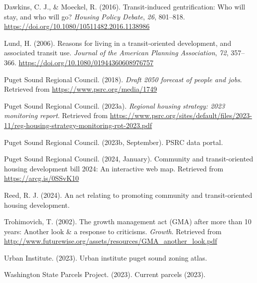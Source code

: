 \documentclass[
]{agujournal2019}
\newlength{\cslhangindent}
\newenvironment{CSLReferences}[2] %
 {\begin{list}{}{%
  \setlength{\itemindent}{0pt}
  \setlength{\leftmargin}{0pt}
  \setlength{\parsep}{0pt}
  \ifodd #1
   \setlength{\leftmargin}{\cslhangindent}
   \setlength{\itemindent}{-1\cslhangindent}
  \fi
  \setlength{\itemsep}{#2\baselineskip}}}
 {\end{list}}
\begin{document}
\label{refs}
\begin{CSLReferences}{1}{0}
\vspace{1em}

Dawkins, C. J., \& Moeckel, R. (2016). Transit-induced gentrification:
Who will stay, and who will go? \emph{Housing Policy Debate}, \emph{26},
801--818. \url{https://doi.org/10.1080/10511482.2016.1138986}

Lund, H. (2006). Reasons for living in a transit-oriented development,
and associated transit use. \emph{Journal of the American Planning
Association}, \emph{72}, 357--366.
\url{https://doi.org/10.1080/01944360608976757}

Puget Sound Regional Council. (2018). \emph{Draft 2050 forecast of
people and jobs}. Retrieved from \url{https://www.psrc.org/media/1749}

Puget Sound Regional Council. (2023a). \emph{Regional housing strategy:
2023 monitoring report}. Retrieved from
\url{https://www.psrc.org/sites/default/files/2023-11/reg-housing-strategy-monitoring-rpt-2023.pdf}

Puget Sound Regional Council. (2023b, September). PSRC data portal.

Puget Sound Regional Council. (2024, January). Community and
transit-oriented housing development bill 2024: An interactive web map.
Retrieved from \url{https://arcg.is/0SSvK10}

Reed, R. J. (2024). An act relating to promoting community and
transit-oriented housing development.

Trohimovich, T. (2002). The growth management act (GMA) after more than
10 years: Another look \& a response to criticisms. \emph{Growth}.
Retrieved from
\url{http://www.futurewise.org/assets/resources/GMA_another_look.pdf}

Urban Institute. (2023). Urban institute puget sound zoning atlas.

Washington State Parcels Project. (2023). Current parcels (2023).

\end{CSLReferences}
\end{document}
